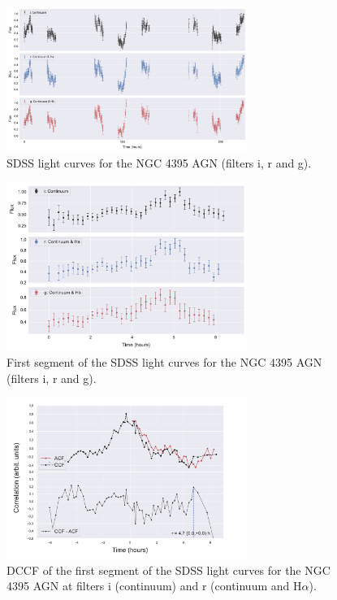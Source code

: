 \documentclass[letterpaper, oneside]{article}
\begin{document}
\begin{figure}[h]
	\centering
	\includegraphics[width=0.7\textwidth]{../lc_plots/ngc4395_sdss_lcs.pdf}
	\caption{SDSS light curves for the NGC 4395 AGN (filters i, r and g).}
	\label{fig:ngc4395_lcs}
\end{figure}

\begin{figure}[h]
	\centering
	\includegraphics[width=0.7\textwidth]{../lc_plots/ngc4395_sdss_1st_lc.pdf}
	\caption{First segment of the SDSS light curves for the NGC 4395 AGN (filters i, r and g).}
	\label{fig:ngc4395_1st_lcs}
\end{figure}

\begin{figure}[h]
	\centering
	\includegraphics[width=0.7\textwidth]{../CCF_plots/NGC4395_i_r.pdf}
	\caption{DCCF of the first segment of the SDSS light curves for the NGC 4395 AGN at filters i (continuum) and r (continuum and H$\alpha$).}
	\label{fig:ngc4395_ccf}
\end{figure}
\end{document}
